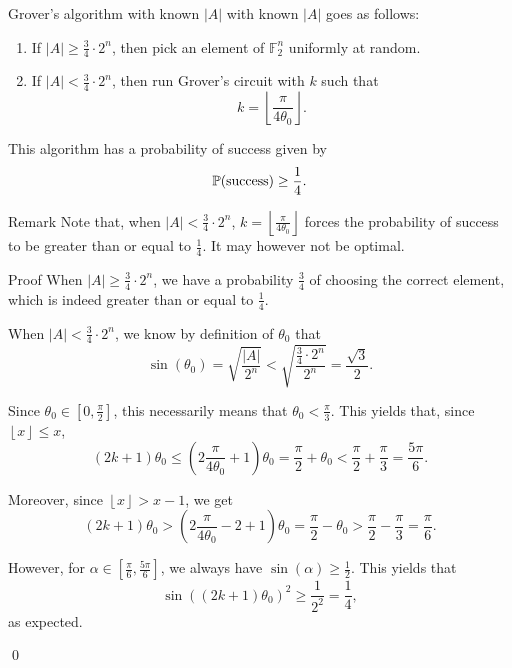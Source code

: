 \documentclass[a4paper]{article}
\begin{document}
\begin{parag}{Grover's algorithm with known $\left|A\right|$}
     with known $\left|A\right|$ goes as follows:
    \begin{enumerate}
        \item If $\left|A\right| \geq \frac{3}{4}\cdot  2^n$, then pick an element of $\mathbb{F}_2^n$ uniformly at random.
        \item If $\left|A\right| < \frac{3}{4}\cdot 2^n$, then run Grover's circuit with $k$ such that 
        \[k = \left\lfloor \frac{\pi}{4 \theta_0} \right\rfloor.\]
    \end{enumerate}

    This algorithm has a probability of success given by
    \[\prob\left(\text{success}\right) \geq \frac{1}{4}.\]

    \begin{subparag}{Remark}
        Note that, when $\left|A\right| < \frac{3}{4}\cdot  2^n$, $k = \left\lfloor \frac{\pi}{4 \theta_0} \right\rfloor$ forces the probability of success to be greater than or equal to $\frac{1}{4}$. It may however not be optimal.
    \end{subparag}
    
    \begin{subparag}{Proof}
        When $\left|A\right| \geq \frac{3}{4}\cdot 2^n$, we have a probability $\frac{3}{4}$ of choosing the correct element, which is indeed greater than or equal to $\frac{1}{4}$.

        When $\left|A\right| < \frac{3}{4} \cdot 2^n$, we know by definition of $\theta_0$ that 
        \[\sin\left(\theta_0\right) = \sqrt{\frac{\left|A\right|}{2^n}} < \sqrt{\frac{\frac{3}{4}\cdot  2^n}{2^n}} = \frac{\sqrt{3}}{2}.\]

        Since $\theta_0 \in \left[0, \frac{\pi}{2}\right]$, this necessarily means that $\theta_0 < \frac{\pi}{3}$. This yields that, since $\left\lfloor x \right\rfloor \leq x$,
        \[\left(2k + 1\right) \theta_0 \leq \left(2 \frac{\pi}{4 \theta_0}  + 1\right) \theta_0 = \frac{\pi}{2} + \theta_0 < \frac{\pi}{2} + \frac{\pi}{3} = \frac{5\pi}{6}.\]

        Moreover, since $\left\lfloor x \right\rfloor > x - 1$, we get
        \[\left(2k + 1\right) \theta_0 > \left(2 \frac{\pi}{4 \theta_0} - 2 + 1\right) \theta_0 = \frac{\pi}{2} - \theta_0 > \frac{\pi}{2} - \frac{\pi}{3} = \frac{\pi}{6}.\]

        However, for $\alpha \in \left[\frac{\pi}{6}, \frac{5\pi}{6}\right]$, we always have $\sin\left(\alpha\right) \geq \frac{1}{2}$. This yields that 
        \[\sin\left(\left(2k + 1\right) \theta_0\right)^2 \geq \frac{1}{2^2} = \frac{1}{4},\]
        as expected.

        \qed
   \end{subparag}
\end{parag}
\end{document}
